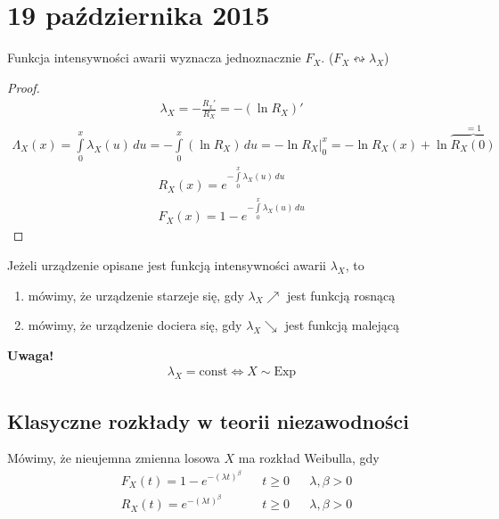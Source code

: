 \chapter{19 października 2015}
\begin{twr}
Funkcja intensywności awarii wyznacza jednoznacznie $ F_X $. ($ F_X\leftrightsquigarrow \lambda_X $)
\begin{proof}
\begin{gather*}
\lambda_X=-\frac{R_x'}{R_X}=-\left(\ln R_X\right)'
\end{gather*}
\begin{align*}
\Lambda_X(x)
=
\int\limits_{0}^{x}\lambda_X(u)\,du
=
-\int\limits_{0}^{x}\left(\ln R_X\right)\,du
=
\left. -\ln R_X \right|_0^x
=
-\ln R_X(x)+\ln \overset{=1}{\overbrace{R_X(0)}}
\end{align*}
\begin{gather*}
R_X(x)=e^{-\int\limits_{0}^{x}\lambda_X(u)\,du}\\
F_X(x)=1-e^{-\int\limits_{0}^{x}\lambda_X(u)\,du}
\end{gather*}
\end{proof}
\end{twr}
\begin{defi}
Jeżeli urządzenie opisane jest funkcją intensywności awarii $ \lambda_X $, to
\begin{enumerate}
\item mówimy, że urządzenie starzeje się, gdy $ \lambda_X\nearrow $ jest funkcją rosnącą
\item mówimy, że urządzenie dociera się, gdy $ \lambda_X\searrow $ jest funkcją malejącą
\end{enumerate}
\end{defi}
\textbf{Uwaga!}
\begin{gather*}
\lambda_X=\text{const}\Leftrightarrow X\sim \text{Exp}
\end{gather*}
\newpage
\section{Klasyczne rozkłady w teorii niezawodności}
\begin{defi}
Mówimy, że nieujemna zmienna losowa $ X $ ma rozkład Weibulla, gdy
\begin{align*}
&F_X(t)=1-e^{-(\lambda t)^\beta}&&t\ge 0&&\lambda,\beta>0\\
&R_X(t)=e^{-(\lambda t)^\beta}&&t\ge 0&&\lambda,\beta>0
\end{align*}
\end{defi}


